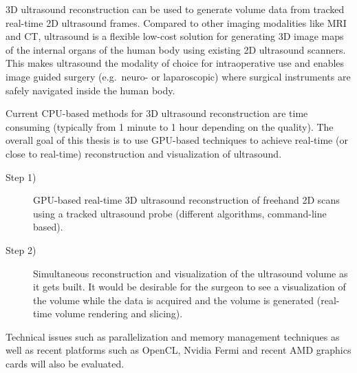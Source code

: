 3D ultrasound reconstruction can be used to generate volume data from tracked real-time 2D ultrasound frames. Compared to other imaging modalities like MRI and CT, ultrasound is a flexible low-cost solution for generating 3D image maps of the internal organs of the human body using existing 2D ultrasound scanners. This makes ultrasound the modality of choice for intraoperative use and enables image guided surgery (e.g.\ neuro- or laparoscopic) where surgical instruments are safely navigated inside the human body.

Current CPU-based methods for 3D ultrasound reconstruction are time consuming (typically from 1 minute to 1 hour depending on the quality). The overall goal of this thesis is to use GPU-based techniques to achieve real-time (or close to real-time) reconstruction and visualization of ultrasound.

\begin{description}
	\item[Step 1)] GPU-based real-time 3D ultrasound reconstruction of freehand 2D scans using a tracked ultrasound probe (different algorithms, command-line based).
	
	\item[Step 2)] Simultaneous reconstruction and visualization of the ultrasound volume as it gets built. It would be desirable for the surgeon to see a visualization of the volume while the data is acquired and the volume is generated (real-time volume rendering and slicing).
\end{description}

Technical issues such as parallelization and memory management techniques as well as recent platforms such as OpenCL, Nvidia Fermi and recent AMD graphics cards will also be evaluated.